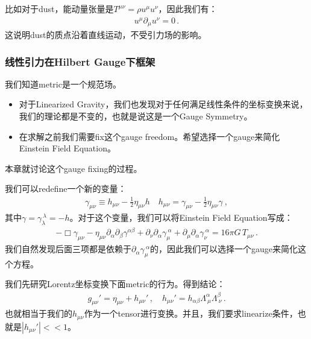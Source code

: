 比如对于dust，能动量张量是$ T^{\mu\nu} = \rho u^\mu u^\nu $，因此我们有：
\begin{align}
  u^\mu \partial_\mu u^\nu = 0 \, .
\end{align}
这说明dust的质点沿着直线运动，不受引力场的影响。

\subsubsection{线性引力在Hilbert Gauge下框架}

我们知道metric是一个规范场。
\begin{itemize}
  \item 对于Linearized
    Gravity，我们也发现对于任何满足线性条件的坐标变换来说，我们的理论都是不变的，也就是说这是一个Gauge Symmetry。
  \item 在求解之前我们需要fix这个gauge freedom。希望选择一个gauge来简化Einstein Field Equation。
\end{itemize}
本章就讨论这个gauge fixing的过程。

\bigskip
{}

我们可以redefine一个新的变量：
\begin{align}
  \gamma_{\mu\nu}\equiv h_{\mu\nu}-\frac{1}{2}\eta_{\mu\nu}h \quad
  h_{\mu\nu}=\gamma_{\mu\nu}-\frac{1}{2}\eta_{\mu\nu}\gamma\mathrm{~,}
\end{align}
其中$ \gamma = \gamma_\lambda^{\ \lambda} = -h $。对于这个变量，我们可以将Einstein
Field Equation写成：
\begin{align}
  -\Box \gamma_{\mu\nu}
  - \eta_{\mu\nu} \partial_\alpha \partial_\beta \gamma^{\alpha\beta}
  + \partial_\nu \partial_\alpha \gamma_{\mu}^{\ \alpha}
  + \partial_\mu \partial_\alpha \gamma_{\nu}^{\ \alpha}
  = 16\pi G\, T_{\mu\nu} \, .
\end{align}
我们自然发现后面三项都是依赖于$ \partial_\alpha \gamma_{\mu}^{\ \alpha}
$的，因此我们可以选择一个gauge来简化这个方程。

\bigskip
{}

我们先研究Lorentz坐标变换下面metric的行为。得到结论：
\begin{align}
  g_{\mu\nu}' = \eta_{\mu\nu} + h_{\mu\nu}' \, , \quad h_{\mu\nu}' =
  h_{\alpha\beta} \Lambda^{\alpha}_{\ \mu} \Lambda^{\beta}_{\ \nu} \, .
\end{align}
也就相当于我们的$ h_{\mu\nu} $作为一个tensor进行变换。并且，我们要求linearize条件，也就是$
|h_{\mu\nu}'| << 1 $。

\bigskip
{}

